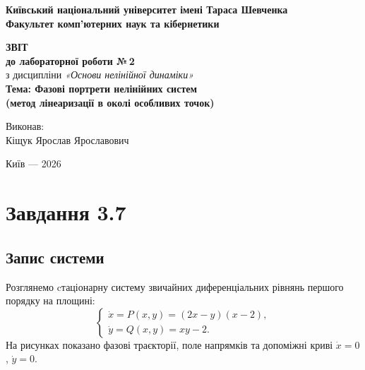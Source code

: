 \documentclass[12pt,a4paper]{article}
\begin{document}
\begin{titlepage}
    \begin{center}
        \textbf{Київський національний університет імені Тараса Шевченка}\\
        \textbf{Факультет комп'ютерних наук та кібернетики}
    \end{center}

    \vspace{4cm}

    \begin{center}
        \textbf{\Large ЗВІТ}\\
        \vspace{0.5cm}
        \textbf{\large до лабораторної роботи №\,2}\\
        \vspace{0.5cm}
        з дисципліни \textit{«Основи нелінійної динаміки»}\\
        \vspace{0.7cm}
        \textbf{Тема: Фазові портрети нелінійних систем\\(метод лінеаризації в околі особливих точок)}
    \end{center}

    \vfill

    \begin{flushright}
        Виконав:\\
        Кіщук Ярослав Ярославович
    \end{flushright}

    \vspace{1.5cm}

    \begin{center}
        Київ --- 2026
    \end{center}
\end{titlepage}

\tableofcontents
\newpage

\section{Завдання 3.7}

\subsection{Запис системи}

Розглянемо cтаціонарну систему звичайних диференціальних рівнянь першого порядку на площині:
\begin{equation}\label{eq:system}
\begin{cases}
\dot{x} = P(x,y) = (2x-y)(x-2),\\
\dot{y} = Q(x,y) = xy - 2.
\end{cases}
\end{equation}
На рисунках показано фазові траєкторії, поле напрямків та допоміжні криві $\dot{x}=0$, $\dot{y}=0$.
\end{document}
